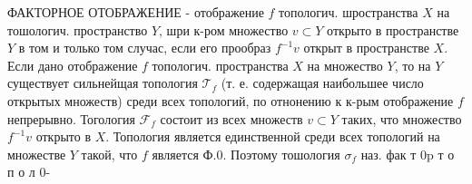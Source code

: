 \documentclass[10pt]{article}
\begin{document}
ФАКТОРНОЕ ОТОБРАЖЕНИЕ - отображение $f$ топологич. шространства $X$ на тошологич. пространство $Y$, шри к-ром множество $v \subset Y$ открыто в пространстве $Y$ в том и только том случас, если его прообраз $f^{-1} v$ открыт в пространстве $X$. Если дано отображение $f$ топологич. пространства $X$ на множество $Y$, то на $Y$ существует сильнейщая топология $\mathscr{T}_{f}$ (т. е. содержащая наибольшее число открытых множеств) среди всех топологий, по отнонению к к-рым отображение $f$ непрерывно. Тогология $\mathscr{F}_{f}$ состоит из всех множеств $v \subset Y$ таких, что множество $f^{-1} v$ открыто в $X$. Топология является единственной среди всех топологий на множестве $Y$ такой, что $f$ является Ф.0. Поэтому тошология $\mathscr{\sigma}_{f}$ наз. фак т $0 \mathrm{p}$ т $о$ п о л 0-
\end{document}
